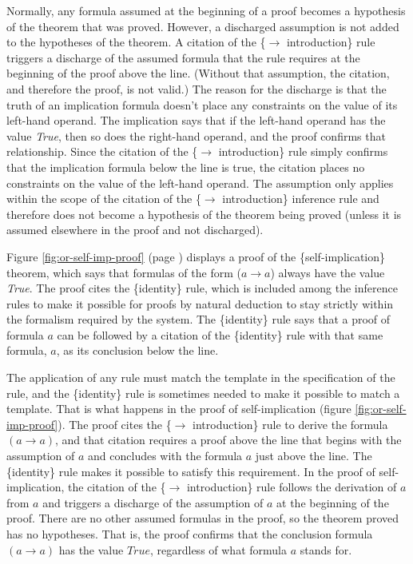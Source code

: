 {Normally, any formula assumed at the beginning of a proof
becomes a hypothesis of the theorem that was proved.
However, a
discharged
assumption
is not added to the hypotheses of the theorem.
A citation of the
\{$\rightarrow$ introduction\} rule
triggers a discharge of the assumed formula that the
rule requires at the beginning of the proof above the line.
(Without that assumption, the citation,
and therefore the proof, is not valid.)
The reason for the discharge is that the truth of an implication
formula doesn't place any constraints on the value of its
left-hand operand.
The implication says that if the left-hand operand
has the value \emph{True}, then so does the right-hand operand,
and the proof confirms that relationship.
Since the citation of the
\{$\rightarrow$ introduction\} rule
simply confirms that the implication formula below the line
is true, the citation places no constraints on the value
of the left-hand operand.
The assumption only applies within the scope
of the citation of the \{$\rightarrow$ introduction\} inference rule
and therefore does not become a hypothesis of the theorem being proved
(unless it is assumed elsewhere in the proof and not discharged).

Figure \ref{fig:or-self-imp-proof} (page \pageref{fig:or-self-imp-proof})
displays a proof of the \{self-implication\} theorem,
which says that formulas of the form ($a \rightarrow a$) always have the value \emph{True}.
The proof cites the \{identity\} rule,
which is included among the inference rules to make it
possible for proofs by natural deduction to stay strictly
within the formalism required by the system.
The \{identity\} rule says that a proof of formula $a$
can be followed by a citation of the \{identity\} rule
with that same formula, $a$, as its conclusion below the line.

The application of any rule must match
the template in the specification of the rule,
and the \{identity\} rule is sometimes needed to make it possible to match a template.
That is what happens in the proof of self-implication (figure \ref{fig:or-self-imp-proof}).
The proof cites the \{$\rightarrow$ introduction\} rule
to derive the formula $(a \rightarrow a)$,
and that citation requires
a proof above the line that begins with the assumption of $a$
and concludes with the formula $a$ just above the line.
The \{identity\} rule makes it possible to satisfy this requirement.
In the proof of self-implication,
the citation of the
\{$\rightarrow$ introduction\} rule
follows the derivation of $a$ from $a$ and triggers a
discharge
of the assumption of $a$ at the beginning of the proof.
There are no other assumed formulas in the proof,
so the theorem proved has no hypotheses.
That is, the proof confirms that the
conclusion formula
$(a \rightarrow a)$ has the value $True$, regardless of
what formula $a$ stands for.

}
